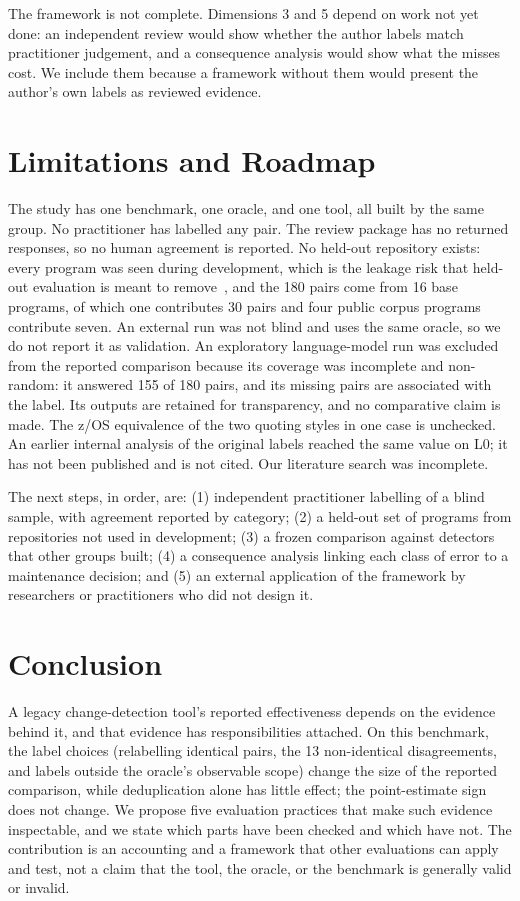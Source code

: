 \documentclass[conference]{IEEEtran}
\begin{document}
The framework is not complete. Dimensions 3 and 5 depend on work not yet done: an independent review would show whether the author labels match practitioner judgement, and a consequence analysis would show what the misses cost. We include them because a framework without them would present the author's own labels as reviewed evidence.

\section{Limitations and Roadmap}
\label{sec:limits}
The study has one benchmark, one oracle, and one tool, all built by the same group. No practitioner has labelled any pair. The review package has no returned responses, so no human agreement is reported. No held-out repository exists: every program was seen during development, which is the leakage risk that held-out evaluation is meant to remove~\cite{kapoor2023}, and the 180 pairs come from 16 base programs, of which one contributes 30 pairs and four public corpus programs contribute seven. An external run was not blind and uses the same oracle, so we do not report it as validation. An exploratory language-model run was excluded from the reported comparison because its coverage was incomplete and non-random: it answered 155 of 180 pairs, and its missing pairs are associated with the label. Its outputs are retained for transparency, and no comparative claim is made. The z/OS equivalence of the two quoting styles in one case is unchecked. An earlier internal analysis of the original labels reached the same value on L0; it has not been published and is not cited. Our literature search was incomplete.

The next steps, in order, are: (1) independent practitioner labelling of a blind sample, with agreement reported by category; (2) a held-out set of programs from repositories not used in development; (3) a frozen comparison against detectors that other groups built; (4) a consequence analysis linking each class of error to a maintenance decision; and (5) an external application of the framework by researchers or practitioners who did not design it.

\section{Conclusion}
A legacy change-detection tool's reported effectiveness depends on the evidence behind it, and that evidence has responsibilities attached. On this benchmark, the label choices (relabelling identical pairs, the 13 non-identical disagreements, and labels outside the oracle's observable scope) change the size of the reported comparison, while deduplication alone has little effect; the point-estimate sign does not change. We propose five evaluation practices that make such evidence inspectable, and we state which parts have been checked and which have not. The contribution is an accounting and a framework that other evaluations can apply and test, not a claim that the tool, the oracle, or the benchmark is generally valid or invalid.



\end{document}
